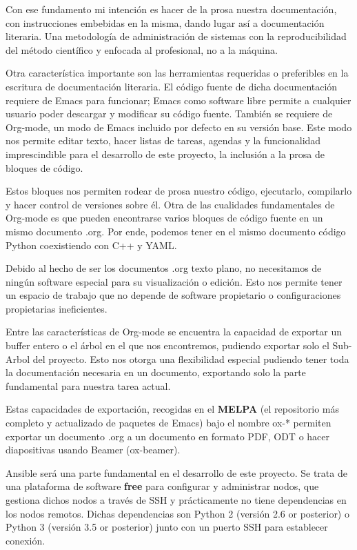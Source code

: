 \documentclass[11pt]{article}
\begin{document}
Con ese fundamento mi intención es hacer de la prosa nuestra documentación, con instrucciones embebidas en la misma, dando lugar así a documentación literaria. Una metodología de administración de sistemas con la reproducibilidad del método científico y enfocada al profesional, no a la máquina.

Otra característica importante son las herramientas requeridas o preferibles en la escritura de documentación literaria. El código fuente de dicha documentación requiere de Emacs para funcionar; Emacs como software libre permite a cualquier usuario poder descargar y modificar su código fuente. También se requiere de Org-mode, un modo de Emacs incluido por defecto en su versión base. Este modo nos permite editar texto, hacer listas de tareas, agendas y la funcionalidad imprescindible para el desarrollo de este proyecto, la inclusión a la prosa de bloques de código.

Estos bloques nos permiten rodear de prosa nuestro código, ejecutarlo, compilarlo y hacer control de versiones sobre él. Otra de las cualidades fundamentales de Org-mode es que pueden encontrarse varios bloques de código fuente en un mismo documento .org. Por ende, podemos tener en el mismo documento código Python coexistiendo con C++ y YAML.

Debido al hecho de ser los documentos .org texto plano, no necesitamos de ningún software especial para su visualización o edición. Esto nos permite tener un espacio de trabajo que no depende de software propietario o configuraciones propietarias ineficientes.

Entre las características de Org-mode se encuentra la capacidad de exportar un buffer entero o el árbol en el que nos encontremos, pudiendo exportar solo el Sub-Arbol del proyecto. Esto nos otorga una flexibilidad especial pudiendo tener toda la documentación necesaria en un documento, exportando solo la parte fundamental para nuestra tarea actual.

Estas capacidades de exportación, recogidas en el \textbf{MELPA} (el repositorio más completo y actualizado de paquetes de Emacs) bajo el nombre ox-* permiten exportar un documento .org a un documento en formato PDF, ODT o hacer diapositivas usando Beamer (ox-beamer).

Ansible será una parte fundamental en el desarrollo de este proyecto. Se trata de una plataforma de software \textbf{free} para configurar y administrar nodos, que gestiona dichos nodos a través de SSH y prácticamente no tiene dependencias en los nodos remotos. Dichas dependencias son Python 2 (versión 2.6 or posterior) o Python 3 (versión 3.5 or posterior) junto con un puerto SSH para establecer conexión.
\end{document}
